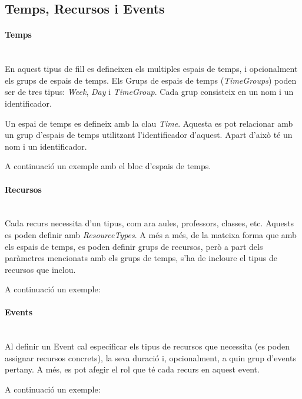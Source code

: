 \documentclass[11pt,a4paper,twoside]{report}
\begin{document}
  \subsection{Temps, Recursos i Events}
  \paragraph*{Temps}~\\
  En aquest tipus de fill es defineixen els multiples espais de temps, i opcionalment els grups de espais de temps. Els Grups de espais de temps (\textit{TimeGroups}) poden ser de tres tipus: 
  \textit{Week}, \textit{Day} i \textit{TimeGroup}. Cada grup consisteix en un nom i un identificador.
  
  Un espai de temps es defineix amb la clau \textit{Time}. Aquesta es pot relacionar amb un grup d'espais de temps utilitzant l'identificador d'aquest. Apart d'això té un nom i un identificador.

  A continuació un exemple amb el bloc d'espais de temps.

  


  \paragraph*{Recursos}~\\
  Cada recurs necessita d'un tipus, com ara aules, professors, classes, etc. Aquests es poden definir amb \textit{ResourceTypes}. A més a més, de la mateixa forma que amb els espais de temps, es poden definir grups de recursos, però a part dels paràmetres mencionats amb els grups de temps, s'ha de incloure el tipus de recursos que inclou. 

  A continuació un exemple:

  

  \paragraph*{Events}~\\
  Al definir un Event cal especificar els tipus de recursos que necessita (es poden assignar recursos concrets), la seva duració i, opcionalment, a quin grup d'events pertany. A més, es pot afegir el rol que té cada recurs en aquest event.

  A continuació un exemple:

  
\end{document}
